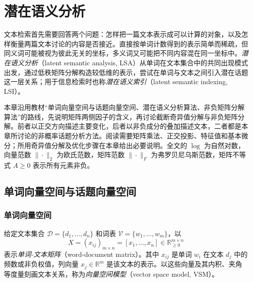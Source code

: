 \setcounter{chapter}{16} %
\chapter{潜在语义分析}
\label{ch:lh-lsa}

文本检索首先需要回答两个问题：怎样把一篇文本表示成可以计算的对象，以及怎样衡量两篇文本讨论的内容是否接近。直接按单词计数得到的表示简单而稀疏，但同义词可能被视为彼此无关的坐标，多义词又可能把不同内容混在同一坐标中。\emph{潜在语义分析}（latent semantic analysis, LSA）从单词在文本集合中的共同出现模式出发，通过低秩矩阵分解构造较低维的表示，尝试在单词与文本之间引入潜在话题这一层关系；用于信息检索时也称\emph{潜在语义索引}（latent semantic indexing, LSI）。

本章沿用教材“单词向量空间与话题向量空间、潜在语义分析算法、非负矩阵分解算法”的路线，先说明矩阵两侧因子的含义，再讨论截断奇异值分解与非负矩阵分解。前者以正交方向描述主要变化，后者以非负成分的叠加描述文本，二者都是本章所讨论的非概率话题分析方法。阅读需要矩阵乘法、正交投影、特征值和基本微分；所用奇异值分解及优化步骤在本章给出必要说明。全文的 $\log$ 为自然对数，向量范数 $\|\cdot\|_2$ 为欧氏范数，矩阵范数 $\|\cdot\|_F$ 为弗罗贝尼乌斯范数，矩阵不等式 $A\geq0$ 表示所有元素非负。

\section{单词向量空间与话题向量空间}
\label{sec:lh-lsa-spaces}

\subsection{单词向量空间}
\label{subsec:lh-lsa-word-space}

\begin{definition}[单词向量空间模型]
\label{def:lh-lsa-vsm}
给定文本集合 $\mathcal D=\{d_1,\ldots,d_n\}$ 和词表 $\mathcal V=\{w_1,\ldots,w_m\}$，以
\begin{equation}
X=(x_{ij})_{m\times n}=[x_1,\ldots,x_n]\in\mathbb R_{\geq0}^{m\times n}
\label{eq:lh-lsa-word-document}
\end{equation}
表示\emph{单词-文本矩阵}（word-document matrix）。其中 $x_{ij}$ 是单词 $w_i$ 在文本 $d_j$ 中的频数或非负权值，列向量 $x_j\in\mathbb R^m$ 是该文本的表示。以这些向量及其内积、夹角等度量刻画文本关系，称为\emph{向量空间模型}（vector space model, VSM）。
\end{definition}

